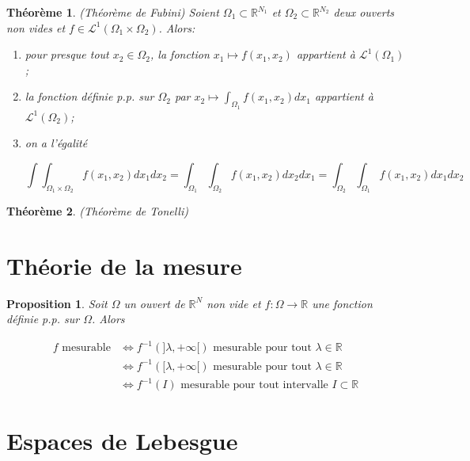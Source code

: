 \documentclass[10pt,a4paper,oneside]{article}
\newtheorem{theoreme}{Théorème}
\newtheorem{proposition}{Proposition}
\begin{document}
\begin{theoreme}
(Théorème de Fubini)
Soient $\Omega_1 \subset \mathbb{R}^{N_1}$ et $\Omega_2 \subset \mathbb{R}^{N_2}$ deux ouverts non vides et $f \in \mathcal{L}^1(\Omega_1 \times \Omega_2)$. Alors:

\begin{enumerate}
\item
pour presque tout $x_2 \in \Omega_2$, la fonction $x_1 \mapsto f(x_1,x_2)$ appartient à $\mathcal{L}^1(\Omega_1)$;

\item
la fonction définie p.p. sur $\Omega_2$ par $x_2 \mapsto \int_{\Omega_1} f(x_1,x_2) dx_1$ appartient à $\mathcal{L}^1(\Omega_2)$;

\item
on a l'égalité

\[ \int \int_{\Omega_1 \times \Omega_2} f(x_1,x_2) dx_1 dx_2 = \int_{\Omega_1} \int_{\Omega_2} f(x_1,x_2) dx_2 dx_1 = \int_{\Omega_2} \int_{\Omega_1} f(x_1,x_2) dx_1 dx_2 \]
\end{enumerate}
\end{theoreme}

\begin{theoreme}
(Théorème de Tonelli)
\end{theoreme}

\section{Théorie de la mesure}

\begin{proposition}
Soit $\Omega$ un ouvert de $\mathbb{R}^N$ non vide et $f : \Omega \to \mathbb{R}$ une fonction définie p.p. sur $\Omega$. Alors

\begin{align*}
f\text{ mesurable} &\Leftrightarrow f^{-1}(]\lambda,+\infty[) \text{ mesurable pour tout } \lambda \in \mathbb{R}\\
&\Leftrightarrow f^{-1}([\lambda,+\infty[) \text{ mesurable pour tout } \lambda \in \mathbb{R}\\
&\Leftrightarrow f^{-1}(I) \text{ mesurable pour tout intervalle } I \subset \mathbb{R}
\end{align*}

\end{proposition}

\section{Espaces de Lebesgue}
\end{document}
